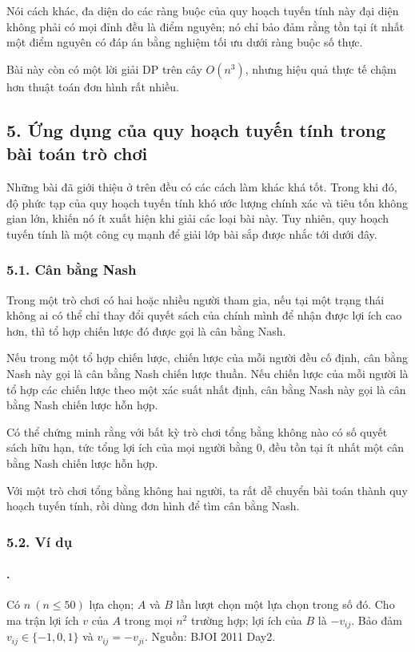 \documentclass[11pt]{article}
\begin{document}
Nói cách khác, đa diện do các ràng buộc của quy hoạch tuyến tính này đại diện
không phải có mọi đỉnh đều là điểm nguyên; nó chỉ bảo đảm rằng tồn tại ít
nhất một điểm nguyên có đáp án bằng nghiệm tối ưu dưới ràng buộc số thực.

Bài này còn có một lời giải DP trên cây \(O(n^3)\), nhưng hiệu quả thực tế
chậm hơn thuật toán đơn hình rất nhiều.

\subsection*{5. Ứng dụng của quy hoạch tuyến tính trong bài toán trò chơi}

Những bài đã giới thiệu ở trên đều có các cách làm khác khá tốt. Trong khi
đó, độ phức tạp của quy hoạch tuyến tính khó ước lượng chính xác và tiêu tốn
không gian lớn, khiến nó ít xuất hiện khi giải các loại bài này. Tuy nhiên,
quy hoạch tuyến tính là một công cụ mạnh để giải lớp bài sắp được nhắc tới
dưới đây.

\subsubsection*{5.1. Cân bằng Nash}

Trong một trò chơi có hai hoặc nhiều người tham gia, nếu tại một trạng thái
không ai có thể chỉ thay đổi quyết sách của chính mình để nhận được lợi ích
cao hơn, thì tổ hợp chiến lược đó được gọi là cân bằng Nash.

Nếu trong một tổ hợp chiến lược, chiến lược của mỗi người đều cố định, cân
bằng Nash này gọi là cân bằng Nash chiến lược thuần. Nếu chiến lược của mỗi
người là tổ hợp các chiến lược theo một xác suất nhất định, cân bằng Nash này
gọi là cân bằng Nash chiến lược hỗn hợp.

Có thể chứng minh rằng với bất kỳ trò chơi tổng bằng không nào có số quyết
sách hữu hạn, tức tổng lợi ích của mọi người bằng \(0\), đều tồn tại ít nhất
một cân bằng Nash chiến lược hỗn hợp.

Với một trò chơi tổng bằng không hai người, ta rất dễ chuyển bài toán thành
quy hoạch tuyến tính, rồi dùng đơn hình để tìm cân bằng Nash.

\subsubsection*{5.2. Ví dụ}

\paragraph{.}
Có \(n\ (n\le 50)\) lựa chọn; \(A\) và \(B\) lần lượt chọn một lựa chọn trong
số đó. Cho ma trận lợi ích \(v\) của \(A\) trong mọi \(n^2\) trường hợp; lợi
ích của \(B\) là \(-v_{ij}\). Bảo đảm \(v_{ij}\in\{-1,0,1\}\) và
\(v_{ij}=-v_{ji}\). Nguồn: BJOI 2011 Day2.
\end{document}
